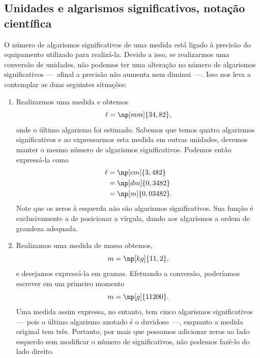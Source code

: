 \subsection{Unidades e algarismos significativos, notação científica}
\label{Sec:UnidadesAlgSigNotacaoCientifica}

O número de algarismos significativos de uma medida está ligado à precisão do equipamento utilizado para realizá-la. Devido a isso, se realizarmos uma conversão de unidades, não podemos ter uma alteração no número de algarismos significativos ---~afinal a precisão não aumenta nem diminui~---. Isso nos leva a contemplar as duas seguintes situações:
\begin{enumerate}
\item Realizarmos uma medida e obtemos
\begin{equation}
	\ell = \np[mm]{34,82},
\end{equation}
%
onde o último algarismo foi estimado. Sabemos que temos quatro algarismos significativos e ao expressarmos esta medida em outras unidades, devemos manter o mesmo número de algarismos significativos. Podemos então expressá-la como
\begin{align}
	\ell &= \np[cm]{3,482} \\
	&= \np[dm]{0,3482} \\
	&= \np[m]{0,03482}.
\end{align}
%
Note que os zeros à esquerda não são algarismos significativos. Sua função é exclusivamente a de posicionar a vírgula, dando aos algarismos a ordem de grandeza adequada.

\item Realizamos uma medida de massa obtemos,
\begin{equation}
	m = \np[kg]{11,2},
\end{equation}
%
e desejamos expressá-la em gramas. Efetuando a conversão, poderíamos escrever em um primeiro momento
\begin{equation}
	m = \np[g]{11200}.
\end{equation}
%
Uma medida assim expressa, no entanto, tem cinco algarismos significativos ---~pois o último algarismo anotado é o duvidoso~---, enquanto a medida original tem três.  Portanto, por mais que possamos adicionar zeros ao lado esquerdo sem modificar o número de significativos, não podemos fazê-lo do lado direito. 


\end{enumerate}
